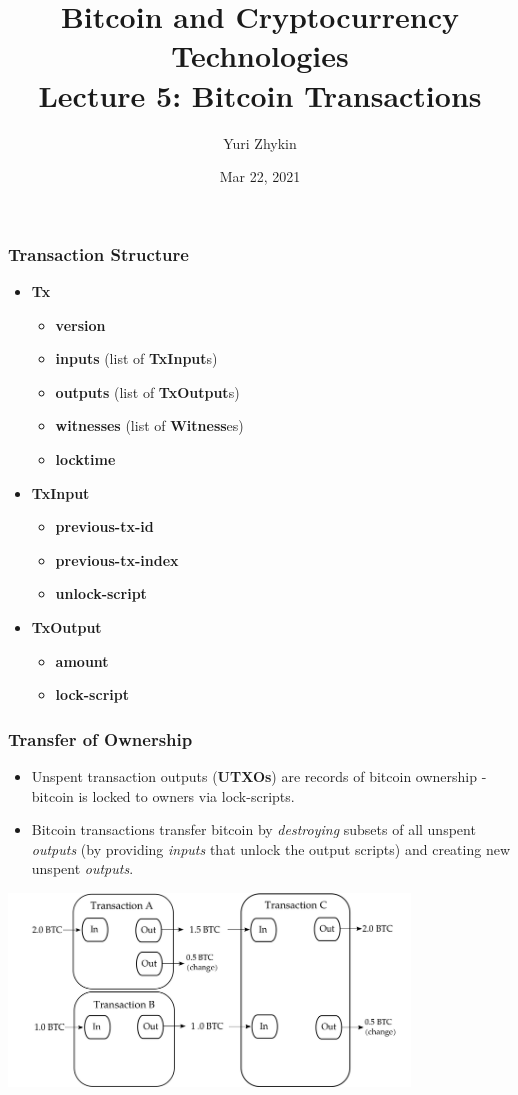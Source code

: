 \documentclass{beamer}
\title{
  Bitcoin and Cryptocurrency Technologies \\
  Lecture 5: Bitcoin Transactions
}
\author{Yuri Zhykin}
\date{Mar 22, 2021}
\begin{document}
\frame{\titlepage}

\begin{frame}
  \frametitle{Transaction Structure}
  \begin{itemize}
  \item \textbf{Tx}
    \begin{itemize}
    \item \textbf{version}
    \item \textbf{inputs} (list of \textbf{TxInput}s)
    \item \textbf{outputs} (list of \textbf{TxOutput}s)
    \item \textbf{witnesses} (list of \textbf{Witness}es)
    \item \textbf{locktime}
    \end{itemize}
  \item \textbf{TxInput}
    \begin{itemize}
    \item \textbf{previous-tx-id}
    \item \textbf{previous-tx-index}
    \item \textbf{unlock-script}
    \end{itemize}
  \item \textbf{TxOutput}
    \begin{itemize}
    \item \textbf{amount}
    \item \textbf{lock-script}
    \end{itemize}
  \end{itemize}
\end{frame}

\begin{frame}[fragile]
  \frametitle{Transfer of Ownership}
  \begin{itemize}
  \item Unspent transaction outputs (\textbf{UTXOs}) are records of bitcoin
    ownership - bitcoin is locked to owners via lock-scripts.
  \item Bitcoin transactions transfer bitcoin by \textit{destroying} subsets of
    all unspent \textit{outputs} (by providing \textit{inputs} that unlock the
    output scripts) and creating new unspent \textit{outputs}.
  \end{itemize}
  \begin{center}
    \includegraphics[width=0.8\textwidth]{transactions}
  \end{center}
\end{frame}
\end{document}
